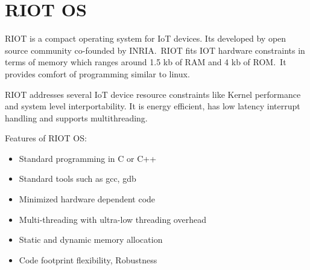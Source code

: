 \section{RIOT OS}

RIOT is a compact operating system for IoT devices. Its developed
by open source community co-founded by INRIA.\ RIOT fits IOT
hardware constraints in terms of memory which ranges around 1.5 kb
of RAM and 4 kb of ROM.\ It provides comfort of programming similar
to linux.

RIOT addresses several IoT device resource constraints like Kernel
performance and system level interportability. It is energy efficient,
has low latency interrupt handling and supports multithreading.

Features of RIOT OS:\
\begin{itemize}
	\item  Standard programming in C or C++
   	\item  Standard tools such as gcc, gdb
	\item  Minimized hardware dependent code
	\item  Multi-threading with ultra-low threading overhead 
   	\item  Static and dynamic memory allocation
	\item  Code footprint flexibility, Robustness
\end{itemize}~\cite{hid-sp18-522-riot}
